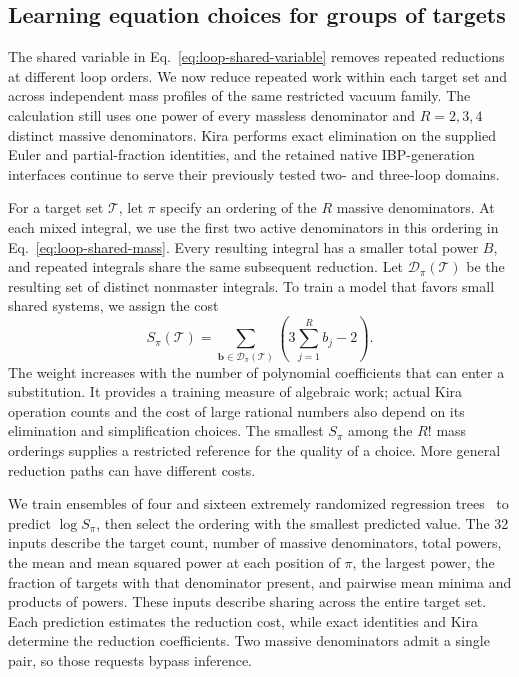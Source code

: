 \subsection{Learning equation choices for groups of targets}
\label{sec:batch-reuse}
The shared variable in Eq.~\eqref{eq:loop-shared-variable} removes repeated
reductions at different loop orders. We now reduce repeated work within
each target set and across independent mass profiles of the same restricted
vacuum family. The calculation still uses one power of every massless
denominator and \(R=2,3,4\) distinct massive denominators. Kira performs
exact elimination on the supplied Euler and partial-fraction identities,
and the retained native IBP-generation interfaces continue to serve their
previously tested two- and three-loop domains.

For a target set \(\mathcal T\), let \(\pi\) specify an ordering of the
\(R\) massive denominators. At each mixed integral, we use the first two
active denominators in this ordering in Eq.~\eqref{eq:loop-shared-mass}.
Every resulting integral has a smaller total power \(B\), and repeated
integrals share the same subsequent reduction. Let
\(\mathcal D_\pi(\mathcal T)\) be the resulting set of distinct nonmaster
integrals. To train a model that favors small shared systems, we assign
the cost
\begin{equation}
 S_\pi(\mathcal T)=
 \sum_{\boldsymbol b\in\mathcal D_\pi(\mathcal T)}
 \left(3\sum_{j=1}^{R}b_j-2\right).
 \label{eq:batch-weighted-cost}
\end{equation}
The weight increases with the number of polynomial coefficients that can
enter a substitution. It provides a training measure of algebraic work;
actual Kira operation counts and the cost of large rational numbers also
depend on its elimination and simplification choices. The smallest
\(S_\pi\) among the \(R!\) mass orderings supplies a restricted reference
for the quality of a choice. More general reduction paths can have
different costs.

We train ensembles of four and sixteen extremely randomized regression
trees~\cite{Geurts2006ExtraTrees} to predict \(\log S_\pi\), then select the
ordering with the smallest predicted value. The 32 inputs describe the
target count, number of massive denominators, total powers, the mean and mean squared power at each
position of \(\pi\), the largest power, the fraction of targets with that
denominator present, and pairwise mean minima and products of powers.
These inputs describe sharing across the entire target set. Each prediction estimates the reduction cost, while exact identities
and Kira determine the reduction coefficients. Two massive denominators admit a single pair, so those
requests bypass inference.

